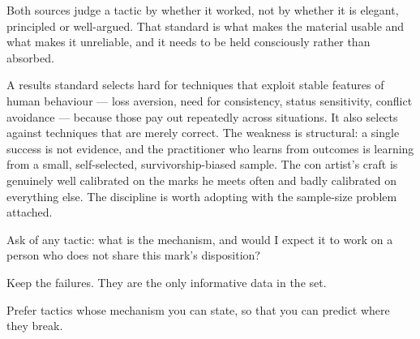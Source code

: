 


\begin{core}
Both sources judge a tactic by whether it worked, not by whether it is elegant, principled or well-argued. That standard is what makes the material usable and what makes it unreliable, and it needs to be held consciously rather than absorbed.
\end{core}

\begin{mechanism}
A results standard selects hard for techniques that exploit stable features of human behaviour --- loss aversion, need for consistency, status sensitivity, conflict avoidance --- because those pay out repeatedly across situations. It also selects against techniques that are merely correct. The weakness is structural: a single success is not evidence, and the practitioner who learns from outcomes is learning from a small, self-selected, survivorship-biased sample. The con artist's craft is genuinely well calibrated on the marks he meets often and badly calibrated on everything else. The discipline is worth adopting with the sample-size problem attached.
\end{mechanism}

\begin{application}
  \item Ask of any tactic: what is the mechanism, and would I expect it to work on a person who does not share this mark's disposition?
  \item Keep the failures. They are the only informative data in the set.
  \item Prefer tactics whose mechanism you can state, so that you can predict where they break.
\end{application}

